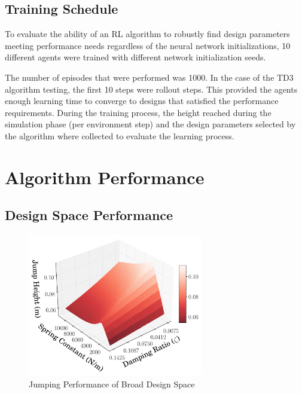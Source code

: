 \documentclass[10pt,twocolumn,letterpaper]{article}
\begin{document}
\subsection{Training Schedule}

To evaluate the ability of an RL algorithm to robustly find design parameters meeting performance needs regardless of the neural network initializations, 10 different agents were trained with different network initialization seeds.

The number of episodes that were performed was 1000. In the case of the TD3 algorithm testing, the first 10 steps were rollout steps. This provided the agents enough learning time to converge to designs that satisfied the performance requirements. During the training process, the height reached during the simulation phase (per environment step) and the design parameters selected by the algorithm where collected to evaluate the learning process.


\section{Algorithm Performance} 
\label{sec:results}

\subsection{Design Space Performance}
%
\begin{figure}[!t]
        \begin{center}
        \includegraphics[width = 3in]{figures/ppo_vs_td3/Design_3D_Plot_0.075_.pdf}  
        \caption{Jumping Performance of Broad Design Space}
        \label{fig:spring_zeta_height}
        \end{center}
\end{figure}
%
\end{document}
